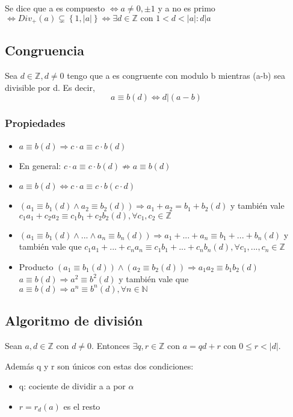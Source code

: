 \documentclass{article}
\begin{document}
Se dice que a es compuesto $\iff a \neq 0, \pm 1$ y a no es primo $\iff Div_+(a) \subsetneq \left\{1, |a|\right\} \iff \exists d \in \mathbb{Z} \text{ con } 1 < d < |a|: d|a$

\subsection{Congruencia}
Sea $d \in \mathbb{Z}, d \neq 0$ tengo que a es congruente con modulo b mientras (a-b) sea divisible por d. Es decir, \begin{equation}
    a \equiv b (d) \iff d|(a-b)
\end{equation}

\subsubsection{Propiedades}
\begin{itemize}
    \item $a \equiv b (d) \Rightarrow c \cdot a \equiv c \cdot b (d)$
    \item En general: $c \cdot a \equiv c \cdot b (d) \nRightarrow a \equiv b (d)$
    \item $a \equiv b (d) \iff c \cdot a \equiv c \cdot b (c \cdot d)$
    \item $(a_1 \equiv b_1 (d) \land a_2 \equiv b_2 (d)) \Rightarrow a_1 + a_2 = b_1 + b_2 (d)$ y también vale $c_1a_1 + c_2a_2 \equiv c_1b_1 + c_2b_2 (d), \forall c_1,c_2 \in \mathbb{Z}$
    \item $(a_1 \equiv b_1 (d) \land ... \land a_n \equiv b_n (d)) \Rightarrow a_1 + ... + a_n \equiv b_1 + ... + b_n (d)$ y también vale que $c_1a_1 + ... + c_na_n \equiv c_1b_1 + ... + c_nb_n (d), \forall c_1,...,c_n \in \mathbb{Z}$
    \item Producto
    \subitem $(a_1 \equiv b_1 (d)) \land (a_2 \equiv b_2 (d)) \Rightarrow a_1a_2 \equiv b_1b_2 (d)$
    \subitem $a \equiv b (d) \Rightarrow a^2 \equiv b^2 (d)$ y también vale que $a \equiv b (d) \Rightarrow a^n \equiv b^n (d), \forall n \in \mathbb{N}$
\end{itemize}

\subsection{Algoritmo de división}
Sean $a, d \in \mathbb{Z}$ con $d \neq 0$. Entonces $\exists q,r \in \mathbb{Z}$ con $a = qd + r$ con $0 \leq r < |d|$.

Además q y r son únicos con estas dos condiciones: \begin{itemize}
    \item q: cociente de dividir a a por $\alpha$
    \item $r = r_d (a)$ es el resto
\end{itemize}
\end{document}
